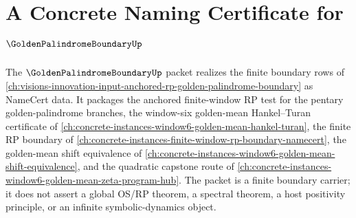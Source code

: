 \chapter{A Concrete Naming Certificate for $\GoldenPalindromeBoundaryUp$}
\label{ch:concrete-instances-golden-palindrome-boundary-namecert}

The $\GoldenPalindromeBoundaryUp$ packet realizes the finite boundary rows of \autoref{ch:visions-innovation-input-anchored-rp-golden-palindrome-boundary} as NameCert data. It packages the anchored finite-window RP test for the pentary golden-palindrome branches, the window-six golden-mean Hankel--Turan certificate of \autoref{ch:concrete-instances-window6-golden-mean-hankel-turan}, the finite RP boundary of \autoref{ch:concrete-instances-finite-window-rp-boundary-namecert}, the golden-mean shift equivalence of \autoref{ch:concrete-instances-window6-golden-mean-shift-equivalence}, and the quadratic capstone route of \autoref{ch:concrete-instances-window6-golden-mean-zeta-program-hub}. The packet is a finite boundary carrier; it does not assert a global OS/RP theorem, a spectral theorem, a host positivity principle, or an infinite symbolic-dynamics object.

